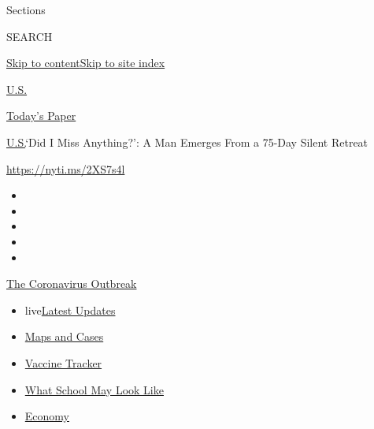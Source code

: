 Sections

SEARCH

\protect\hyperlink{site-content}{Skip to
content}\protect\hyperlink{site-index}{Skip to site index}

\href{https://www.nytimes.com/section/us}{U.S.}

\href{https://myaccount.nytimes.com/auth/login?response_type=cookie\&client_id=vi}{}

\href{https://www.nytimes.com/section/todayspaper}{Today's Paper}

\href{/section/us}{U.S.}\textbar{}`Did I Miss Anything?': A Man Emerges
From a 75-Day Silent Retreat

\url{https://nyti.ms/2XS7s4l}

\begin{itemize}
\item
\item
\item
\item
\item
\end{itemize}

\href{https://www.nytimes.com/news-event/coronavirus?action=click\&pgtype=Article\&state=default\&region=TOP_BANNER\&context=storylines_menu}{The
Coronavirus Outbreak}

\begin{itemize}
\tightlist
\item
  live\href{https://www.nytimes.com/2020/08/01/world/coronavirus-covid-19.html?action=click\&pgtype=Article\&state=default\&region=TOP_BANNER\&context=storylines_menu}{Latest
  Updates}
\item
  \href{https://www.nytimes.com/interactive/2020/us/coronavirus-us-cases.html?action=click\&pgtype=Article\&state=default\&region=TOP_BANNER\&context=storylines_menu}{Maps
  and Cases}
\item
  \href{https://www.nytimes.com/interactive/2020/science/coronavirus-vaccine-tracker.html?action=click\&pgtype=Article\&state=default\&region=TOP_BANNER\&context=storylines_menu}{Vaccine
  Tracker}
\item
  \href{https://www.nytimes.com/interactive/2020/07/29/us/schools-reopening-coronavirus.html?action=click\&pgtype=Article\&state=default\&region=TOP_BANNER\&context=storylines_menu}{What
  School May Look Like}
\item
  \href{https://www.nytimes.com/live/2020/07/31/business/stock-market-today-coronavirus?action=click\&pgtype=Article\&state=default\&region=TOP_BANNER\&context=storylines_menu}{Economy}
\end{itemize}

